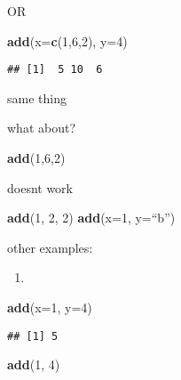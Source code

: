 \documentclass[]{article}
\newenvironment{Shaded}{\begin{snugshade}}{\end{snugshade}}
\newcommand{\DataTypeTok}[1]{\textcolor[rgb]{0.13,0.29,0.53}{#1}}
\newcommand{\DecValTok}[1]{\textcolor[rgb]{0.00,0.00,0.81}{#1}}
\newcommand{\KeywordTok}[1]{\textcolor[rgb]{0.13,0.29,0.53}{\textbf{#1}}}
\newcommand{\NormalTok}[1]{#1}
\begin{document}
OR

\begin{Shaded}
\begin{Highlighting}[]
\KeywordTok{add}\NormalTok{(}\DataTypeTok{x=}\KeywordTok{c}\NormalTok{(}\DecValTok{1}\NormalTok{,}\DecValTok{6}\NormalTok{,}\DecValTok{2}\NormalTok{), }\DataTypeTok{y=}\DecValTok{4}\NormalTok{)}
\end{Highlighting}
\end{Shaded}

\begin{verbatim}
## [1]  5 10  6
\end{verbatim}

same thing

what about?

\begin{Shaded}
\begin{Highlighting}[]
\KeywordTok{add}\NormalTok{(}\DecValTok{1}\NormalTok{,}\DecValTok{6}\NormalTok{,}\DecValTok{2}\NormalTok{)}
\end{Highlighting}
\end{Shaded}

doesnt work

\begin{Shaded}
\begin{Highlighting}[]
\KeywordTok{add}\NormalTok{(}\DecValTok{1}\NormalTok{, }\DecValTok{2}\NormalTok{, }\DecValTok{2}\NormalTok{)}
\KeywordTok{add}\NormalTok{(}\DataTypeTok{x=}\DecValTok{1}\NormalTok{, }\DataTypeTok{y=}\NormalTok{“b”)}
\end{Highlighting}
\end{Shaded}

other examples:

\begin{enumerate}
\def\labelenumi{\arabic{enumi}.}
\item
\end{enumerate}

\begin{Shaded}
\begin{Highlighting}[]
\KeywordTok{add}\NormalTok{(}\DataTypeTok{x=}\DecValTok{1}\NormalTok{, }\DataTypeTok{y=}\DecValTok{4}\NormalTok{)}
\end{Highlighting}
\end{Shaded}

\begin{verbatim}
## [1] 5
\end{verbatim}

\begin{Shaded}
\begin{Highlighting}[]
\KeywordTok{add}\NormalTok{(}\DecValTok{1}\NormalTok{, }\DecValTok{4}\NormalTok{)}
\end{Highlighting}
\end{Shaded}
\end{document}
